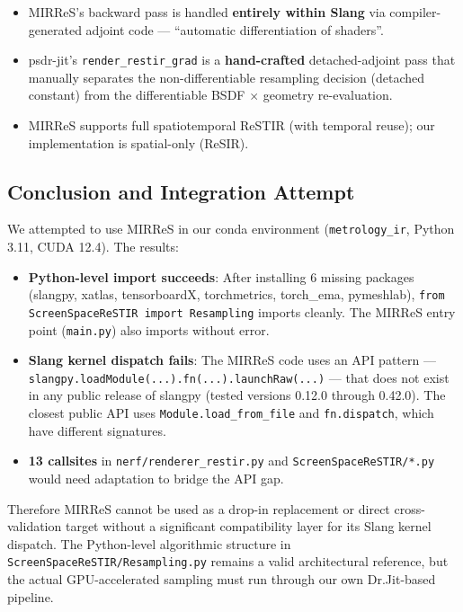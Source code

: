 \begin{itemize}
    \item MIRReS's backward pass is handled \textbf{entirely within Slang}
        via compiler-generated adjoint code --- ``automatic differentiation of
        shaders''.
    \item psdr-jit's \texttt{render\_restir\_grad} is a \textbf{hand-crafted}
        detached-adjoint pass that manually separates the non-differentiable
        resampling decision (detached constant) from the differentiable
        BSDF $\times$ geometry re-evaluation.
    \item MIRReS supports full spatiotemporal ReSTIR (with temporal reuse);
        our implementation is spatial-only (ReSIR).
\end{itemize}

\subsection{Conclusion and Integration Attempt}

We attempted to use MIRReS in our conda environment (\texttt{metrology\_ir},
Python 3.11, CUDA 12.4). The results:

\begin{itemize}
    \item \textbf{Python-level import succeeds}: After installing 6 missing
        packages (slangpy, xatlas, tensorboardX, torchmetrics, torch\_ema,
        pymeshlab), \texttt{from ScreenSpaceReSTIR import Resampling} imports
        cleanly. The MIRReS entry point (\texttt{main.py}) also imports without
        error.
    \item \textbf{Slang kernel dispatch fails}: The MIRReS code uses an API
        pattern --- \texttt{slangpy.loadModule(...).fn(...).launchRaw(...)} ---
        that does not exist in any public release of slangpy (tested versions
        0.12.0 through 0.42.0). The closest public API uses
        \texttt{Module.load\_from\_file} and \texttt{fn.dispatch}, which have
        different signatures.
    \item \textbf{13 callsites} in \texttt{nerf/renderer\_restir.py} and
        \texttt{ScreenSpaceReSTIR/*.py} would need adaptation to bridge the API
        gap.
\end{itemize}

Therefore MIRReS cannot be used as a drop-in replacement or direct
cross-validation target without a significant compatibility layer for its
Slang kernel dispatch. The Python-level algorithmic structure in
\texttt{ScreenSpaceReSTIR/Resampling.py} remains a valid architectural
reference, but the actual GPU-accelerated sampling must run through our
own Dr.Jit-based pipeline.


